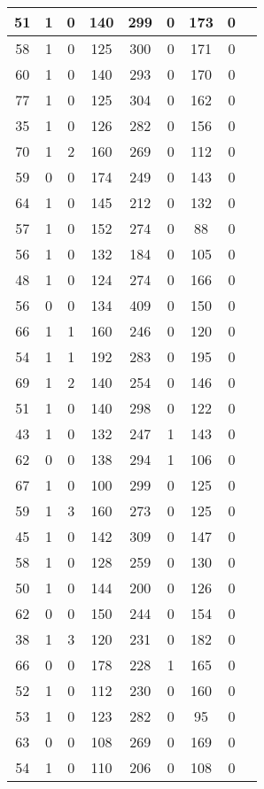 \documentclass{article}
\begin{document}
\begin{longtable}{
|
c|c|c|c|c|c|c|c|c|}
\hline
51 & 1 & 0 & 140 & 299 & 0 & 173 & 0 \\
\hline
58 & 1 & 0 & 125 & 300 & 0 & 171 & 0 \\
\hline
60 & 1 & 0 & 140 & 293 & 0 & 170 & 0 \\
\hline
77 & 1 & 0 & 125 & 304 & 0 & 162 & 0 \\
\hline
35 & 1 & 0 & 126 & 282 & 0 & 156 & 0 \\
\hline
70 & 1 & 2 & 160 & 269 & 0 & 112 & 0 \\
\hline
59 & 0 & 0 & 174 & 249 & 0 & 143 & 0 \\
\hline
64 & 1 & 0 & 145 & 212 & 0 & 132 & 0 \\
\hline
57 & 1 & 0 & 152 & 274 & 0 & 88 & 0 \\
\hline
56 & 1 & 0 & 132 & 184 & 0 & 105 & 0 \\
\hline
48 & 1 & 0 & 124 & 274 & 0 & 166 & 0 \\
\hline
56 & 0 & 0 & 134 & 409 & 0 & 150 & 0 \\
\hline
66 & 1 & 1 & 160 & 246 & 0 & 120 & 0 \\
\hline
54 & 1 & 1 & 192 & 283 & 0 & 195 & 0 \\
\hline
69 & 1 & 2 & 140 & 254 & 0 & 146 & 0 \\
\hline
51 & 1 & 0 & 140 & 298 & 0 & 122 & 0 \\
\hline
43 & 1 & 0 & 132 & 247 & 1 & 143 & 0 \\
\hline
62 & 0 & 0 & 138 & 294 & 1 & 106 & 0 \\
\hline
67 & 1 & 0 & 100 & 299 & 0 & 125 & 0 \\
\hline
59 & 1 & 3 & 160 & 273 & 0 & 125 & 0 \\
\hline
45 & 1 & 0 & 142 & 309 & 0 & 147 & 0 \\
\hline
58 & 1 & 0 & 128 & 259 & 0 & 130 & 0 \\
\hline
50 & 1 & 0 & 144 & 200 & 0 & 126 & 0 \\
\hline
62 & 0 & 0 & 150 & 244 & 0 & 154 & 0 \\
\hline
38 & 1 & 3 & 120 & 231 & 0 & 182 & 0 \\
\hline
66 & 0 & 0 & 178 & 228 & 1 & 165 & 0 \\
\hline
52 & 1 & 0 & 112 & 230 & 0 & 160 & 0 \\
\hline
53 & 1 & 0 & 123 & 282 & 0 & 95 & 0 \\
\hline
63 & 0 & 0 & 108 & 269 & 0 & 169 & 0 \\
\hline
54 & 1 & 0 & 110 & 206 & 0 & 108 & 0 \\

\end{longtable}
\end{document}
